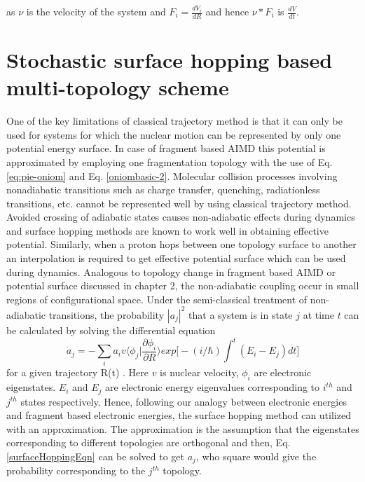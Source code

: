 as $\nu$ is the velocity of the system and $F_{i} = \frac{dV_i}{dR}$ and hence $\nu*F_{i}$ is $\frac{dV}{dt}$.

\section{Stochastic surface hopping based multi-topology scheme}
One of the key limitations of classical trajectory method is that it can only be used for
systems for which the nuclear motion can be represented by only one potential energy
surface. In case of fragment based AIMD this potential is approximated by employing one
fragmentation topology with the use of Eq. \ref{eq:pie-oniom} and Eq. \ref{oniombasic-2}.
Molecular collision processes involving nonadiabatic transitions such as charge transfer,
quenching, radiationless transitions, etc. cannot be represented well by using classical
trajectory method. Avoided crossing of adiabatic states causes non-adiabatic effects
\cite{landau1932theory, zener1932non, stueckelberg1932ecg} during dynamics and surface
hopping methods are known to work well in obtaining effective potential.
Similarly, when a proton hops between one topology surface to another an interpolation is
required to get effective potential surface which can be used during dynamics. Analogous to
topology change in fragment based AIMD or potential surface discussed in chapter 2, the
non-adiabatic coupling occur in small regions of configurational space. 
Under the semi-classical treatment of non-adiabatic transitions, the probability $|a_{j}|^2$
that a system is in state $j$ at time $t$ can be calculated by solving the differential equation
\begin{equation}
\label{surfaceHoppingEqn}
{\dot a}_{j} = - \sum_{i}^{}a_{i}v \big \langle \phi_{j}|\frac{\partial \phi_{i}}{\partial R}
 \big \rangle exp\bigg[-(i/\hbar)\int_{}^{t} (E_{i}-E_{j})dt  \bigg]
\end{equation}
for a given trajectory R(t) \cite{tully1971trajectory}. Here $v$ is nuclear velocity,
$\phi_{i}$ are electronic eigenstates. $E_{i}$ and $E_{j}$ are electronic energy eigenvalues
corresponding to $i^{th}$ and $j^{th}$ states respectively. Hence, following our analogy
between electronic energies and fragment based electronic energies, the surface hopping method
can utilized with an approximation. The approximation is the assumption that the eigenstates
corresponding to different topologies are orthogonal and then, Eq. \ref{surfaceHoppingEqn}
can be solved to get $a_{j}$, who square would give the probability corresponding to the
$j^{th}$ topology.

